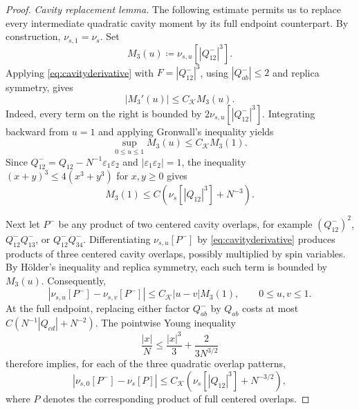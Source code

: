 \documentclass[11pt]{article}
\numberwithin{equation}{section}
\newcommand{\1}{\mathbf 1}
\newcommand{\cK}{\mathcal K}
\begin{document}
\begin{proof}
\medskip
\noindent\emph{Cavity replacement lemma.}
The following estimate permits us to replace every intermediate
quadratic cavity moment by its full endpoint counterpart.  By
construction, $\nu_{s,1}=\nu_s$.  Set
\begin{equation}
 M_3(u)\coloneqq\nu_{s,u}[|Q^-_{12}|^3].
 \label{eq:cavityM3}
\end{equation}
Applying \eqref{eq:cavityderivative} with
$F=|Q^-_{12}|^3$, using $|Q^-_{ab}|\le2$ and replica symmetry, gives
\begin{equation}
 |M_3'(u)|\le C_{\cK}M_3(u).
 \label{eq:cavityM3derivative}
\end{equation}
Indeed, every term on the right is bounded by
$2\nu_{s,u}[|Q^-_{12}|^3]$.  Integrating backward from $u=1$ and applying
Gronwall's inequality yields
\begin{equation}
 \sup_{0\le u\le1}M_3(u)\le C_{\cK}M_3(1).
 \label{eq:cavityM3comparison}
\end{equation}
Since
$Q^-_{12}=Q_{12}-N^{-1}\varepsilon_1\varepsilon_2$ and
$|\varepsilon_1\varepsilon_2|=1$, the inequality
$(x+y)^3\le4(x^3+y^3)$ for $x,y\ge0$ gives
\begin{equation}
 M_3(1)\le C\left(\nu_s[|Q_{12}|^3]+N^{-3}\right).
 \label{eq:cavityM3endpoint}
\end{equation}

Next let $P^-$ be any product of two centered cavity overlaps, for
example $(Q^-_{12})^2$, $Q^-_{12}Q^-_{13}$, or
$Q^-_{12}Q^-_{34}$.  Differentiating $\nu_{s,u}[P^-]$ by
\eqref{eq:cavityderivative} produces products of three centered cavity
overlaps, possibly multiplied by spin variables.  By H\"older's
inequality and replica symmetry, each such term is bounded by $M_3(u)$.
Consequently,
\begin{equation}
 \left|\nu_{s,u}[P^-]-\nu_{s,v}[P^-]\right|
 \le C_{\cK}|u-v|M_3(1),
 \qquad 0\le u,v\le1.
 \label{eq:cavityquadraticcomparison}
\end{equation}
At the full endpoint, replacing either factor $Q^-_{ab}$ by $Q_{ab}$
costs at most
$C(N^{-1}|Q_{cd}|+N^{-2})$.  The pointwise Young inequality
\begin{equation}
 \frac{|x|}{N}\le\frac{|x|^3}{3}+\frac{2}{3N^{3/2}}
 \label{eq:cavityYoung}
\end{equation}
therefore implies, for each of the three quadratic overlap patterns,
\begin{equation}
 \left|\nu_{s,0}[P^-]-\nu_s[P]\right|
 \le C_{\cK}\left(\nu_s[|Q_{12}|^3]+N^{-3/2}\right),
 \label{eq:cavityendpointcomparison}
\end{equation}
where $P$ denotes the corresponding product of full centered overlaps.


\end{proof}
\end{document}
